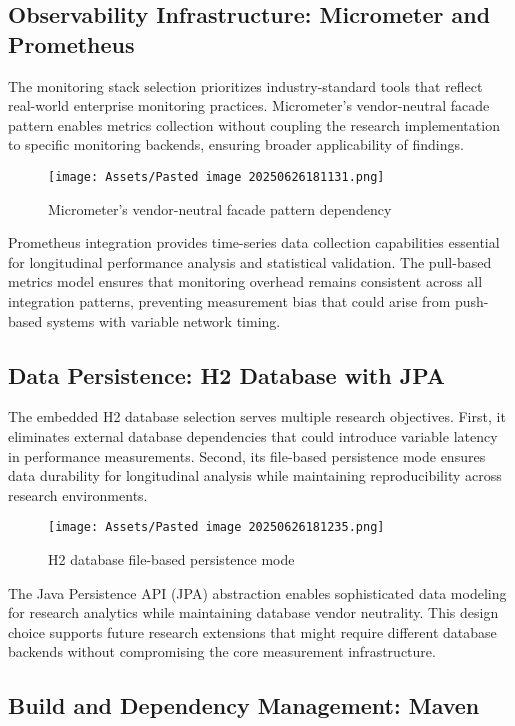 \subsection{Observability Infrastructure: Micrometer and Prometheus}

The monitoring stack selection prioritizes industry-standard tools that reflect real-world enterprise monitoring practices. Micrometer's vendor-neutral facade pattern enables metrics collection without coupling the research implementation to specific monitoring backends, ensuring broader applicability of findings.

\begin{figure}[H]
    \centering
    \texttt{[image: Assets/Pasted image 20250626181131.png]}
    \caption{Micrometer's vendor-neutral facade pattern dependency}
\end{figure}
Prometheus integration provides time-series data collection capabilities essential for longitudinal performance analysis and statistical validation. The pull-based metrics model ensures that monitoring overhead remains consistent across all integration patterns, preventing measurement bias that could arise from push-based systems with variable network timing.

\subsection{Data Persistence: H2 Database with JPA}

The embedded H2 database selection serves multiple research objectives. First, it eliminates external database dependencies that could introduce variable latency in performance measurements. Second, its file-based persistence mode ensures data durability for longitudinal analysis while maintaining reproducibility across research environments.

\begin{figure}[H]
    \centering
    \texttt{[image: Assets/Pasted image 20250626181235.png]}
    \caption{H2 database file-based persistence mode}
\end{figure}
The Java Persistence API (JPA) abstraction enables sophisticated data modeling for research analytics while maintaining database vendor neutrality. This design choice supports future research extensions that might require different database backends without compromising the core measurement infrastructure.

\subsection{Build and Dependency Management: Maven}

